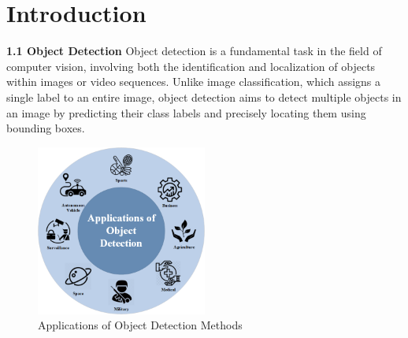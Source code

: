 \chapter{Introduction} 
%
%
{ \textbf{1.1 {Object Detection}}}\newline
\newline
%
%
Object detection is a fundamental task in the field of computer vision, involving both the identification and localization of objects within images or video sequences. Unlike image classification, which assigns a single label to an entire image, object detection aims to detect multiple objects in an image by predicting their class labels and precisely locating them using bounding boxes.\newline
\\
%
\begin{figure}[h!] 
    \centering
    \includegraphics[width=0.5\textwidth]{images/Object Detection Application.png}
    \caption{Applications of Object Detection Methods}
  \end{figure}
\\\\
